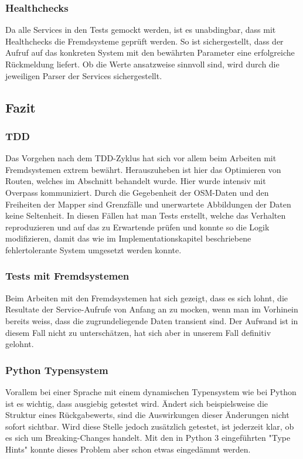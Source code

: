 \subsubsection{Healthchecks}
\label{test:Healthchecks}
Da alle Services in den Tests gemockt werden, ist es unabdingbar, dass mit Healthchecks die Fremdsysteme geprüft werden. So ist sichergestellt, dass der Aufruf auf das konkreten System mit den bewährten Parameter eine erfolgreiche Rückmeldung liefert. Ob die Werte ansatzweise sinnvoll sind, wird durch die jeweiligen Parser der Services sichergestellt.

\subsection{Fazit}
\label{test:Fazit}

\subsubsection{TDD}
\label{fazit:TDD}
Das Vorgehen nach dem \ac{TDD}-Zyklus hat sich vor allem beim Arbeiten mit Fremdsystemen extrem bewährt. Herauszuheben ist hier das Optimieren von Routen, welches im Abschnitt  behandelt wurde. Hier wurde intensiv mit Overpass \cite{wiki:overpass} kommuniziert. Durch die Gegebenheit der \ac{OSM}-Daten und den Freiheiten der Mapper sind Grenzfälle und unerwartete Abbildungen der Daten keine Seltenheit. In diesen Fällen hat man Tests erstellt, welche das Verhalten reproduzieren und auf das zu Erwartende prüfen und konnte so die Logik modifizieren, damit das wie im Implementationskapitel beschriebene fehlertolerante System umgesetzt werden konnte.

\subsubsection{Tests mit Fremdsystemen}
\label{fazit:Tests mit Fremdsystemen}
Beim Arbeiten mit den Fremdsystemen hat sich gezeigt, dass es sich lohnt, die Resultate der Service-Aufrufe von Anfang an zu mocken, wenn man im Vorhinein bereits weiss, dass die zugrundeliegende Daten transient sind. Der Aufwand ist in diesem Fall nicht zu unterschätzen, hat sich aber in unserem Fall definitiv gelohnt.

\subsubsection{Python Typensystem}
\label{fazit:Python Typesystem}
Vorallem bei einer Sprache mit einem dynamischen Typensystem wie bei Python ist es wichtig, dass ausgiebig getestet wird. Ändert sich beispielsweise die Struktur eines Rückgabewerts, sind die Auswirkungen dieser Änderungen nicht sofort sichtbar. Wird diese Stelle jedoch zusätzlich getestet, ist jederzeit klar, ob es sich um Breaking-Changes handelt. Mit den in Python 3 eingeführten "Type Hints" konnte dieses Problem aber schon etwas eingedämmt werden.
